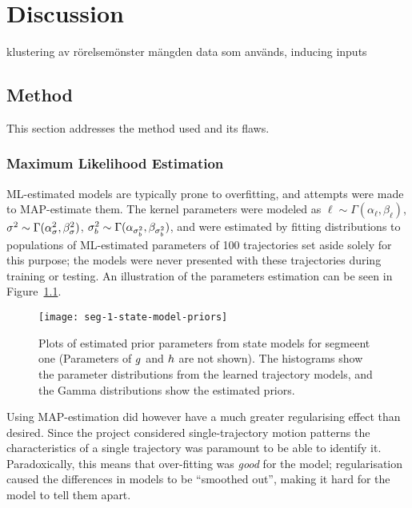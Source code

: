 \chapter{Discussion}
\label{cha:discussion}
klustering av rörelsemönster
mängden data som används, inducing inputs





\section{Method}\label{sec:discussion-method}
This section addresses the method used and its flaws.

\subsection{Maximum Likelihood Estimation}
ML-estimated models are typically prone to overfitting, and attempts were made to
MAP-estimate them. The kernel parameters were modeled as 
$\ell \sim \Gamma(\alpha_\ell, \beta_\ell)$, $\sigma^2 \sim \Gamma(\alpha_\sigma^2, \beta_\sigma^2)$, 
$\sigma^2_b \sim \Gamma(\alpha_{\sigma^2_b}, \beta_{\sigma^2_b})$, and were
estimated by fitting distributions to populations of ML-estimated parameters of 100 trajectories set
aside solely for this purpose; the models were never presented with these
trajectories during training or testing. An illustration of 
the parameters estimation can be seen in Figure~\ref{fig:seg-state-model-priors}.
\begin{figure}
  \texttt{[image: seg-1-state-model-priors]}
  \caption{Plots of estimated prior parameters from state models for
    segmeent one (Parameters of $g$ and $h$ are not
    shown). The histograms show the parameter distributions from
    the learned trajectory models, and the Gamma distributions show
    the estimated priors.}\label{fig:seg-state-model-priors}
\end{figure}
Using MAP-estimation did however have a much greater regularising
effect than desired. Since the project considered single-trajectory
motion patterns the characteristics of a single trajectory was
paramount to be able to identify it. Paradoxically, this means that
over-fitting was \textit{good} for the model; regularisation caused
the differences in models to be ``smoothed out'', making it hard for
the model to tell them apart.

